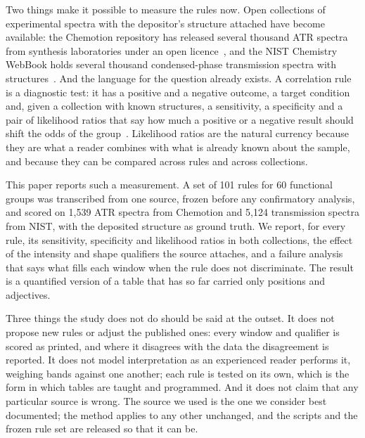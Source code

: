 Two things make it possible to measure the rules now. Open collections of experimental spectra with the depositor's structure attached have become available: the Chemotion repository has released several thousand ATR spectra from synthesis laboratories under an open licence~\cite{punjabi2025chemotion}, and the NIST Chemistry WebBook holds several thousand condensed-phase transmission spectra with structures~\cite{nist_webbook}. And the language for the question already exists. A correlation rule is a diagnostic test: it has a positive and a negative outcome, a target condition and, given a collection with known structures, a sensitivity, a specificity and a pair of likelihood ratios that say how much a positive or a negative result should shift the odds of the group~\cite{deeks2004likelihood}. Likelihood ratios are the natural currency because they are what a reader combines with what is already known about the sample, and because they can be compared across rules and across collections.

This paper reports such a measurement. A set of 101 rules for 60 functional groups was transcribed from one source, frozen before any confirmatory analysis, and scored on 1,539 ATR spectra from Chemotion and 5,124 transmission spectra from NIST, with the deposited structure as ground truth. We report, for every rule, its sensitivity, specificity and likelihood ratios in both collections, the effect of the intensity and shape qualifiers the source attaches, and a failure analysis that says what fills each window when the rule does not discriminate. The result is a quantified version of a table that has so far carried only positions and adjectives.

Three things the study does not do should be said at the outset. It does not propose new rules or adjust the published ones: every window and qualifier is scored as printed, and where it disagrees with the data the disagreement is reported. It does not model interpretation as an experienced reader performs it, weighing bands against one another; each rule is tested on its own, which is the form in which tables are taught and programmed. And it does not claim that any particular source is wrong. The source we used is the one we consider best documented; the method applies to any other unchanged, and the scripts and the frozen rule set are released so that it can be.
